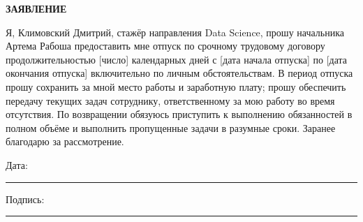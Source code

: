 \documentclass[12pt]{article}
\begin{document}
\begin{center}
\textbf{\LARGE ЗАЯВЛЕНИЕ}
\end{center}

\vspace{1cm}



Я, Климовский Дмитрий, стажёр направления Data Science, прошу начальника Артема Рабоша предоставить мне отпуск по срочному трудовому договору продолжительностью [число] календарных дней с [дата начала отпуска] по [дата окончания отпуска] включительно по личным обстоятельствам. В период отпуска прошу сохранить за мной место работы и заработную плату; прошу обеспечить передачу текущих задач сотруднику, ответственному за мою работу во время отсутствия. По возвращении обязуюсь приступить к выполнению обязанностей в полном объёме и выполнить пропущенные задачи в разумные сроки. Заранее благодарю за рассмотрение.

\vfill

\noindent
Дата: \rule{5cm}{0.4pt} \hfill Подпись: \rule{5cm}{0.4pt}
\end{document}
